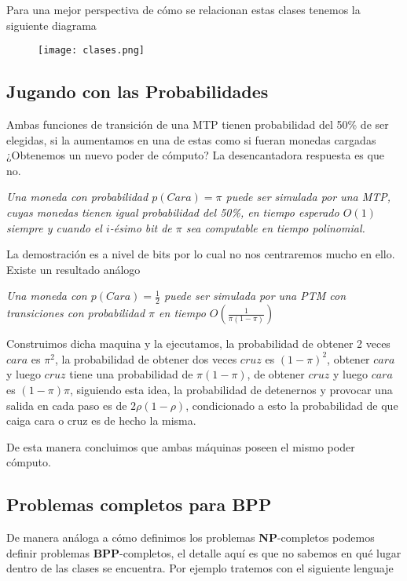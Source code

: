 \documentclass[12pt,letterpaper]{article}
\begin{document}
Para una mejor perspectiva de cómo se relacionan estas clases tenemos la siguiente diagrama

\begin{figure}[htb]
        \centering
        \texttt{[image: clases.png]}
\end{figure}

\subsection*{Jugando con las Probabilidades}

Ambas funciones de transición de una MTP tienen probabilidad del 50\% de ser elegidas, si la aumentamos en una de estas como si fueran monedas cargadas ¿Obtenemos un nuevo poder de cómputo? La desencantadora respuesta es que no.

\textit{Una moneda con probabilidad $p(Cara) = \pi$ puede ser simulada por una MTP, cuyas monedas tienen igual probabilidad del 50\%,  en tiempo esperado $O(1)$ siempre y cuando el $i$-ésimo bit de $\pi$ sea computable en tiempo polinomial.}

La demostración es a nivel de bits por lo cual no nos centraremos mucho en ello. Existe un resultado análogo 

\textit{Una moneda con $p(Cara) = \frac{1}{2}$ puede ser simulada por una PTM con transiciones con probabilidad $\pi$ en tiempo $O(\frac{1}{\pi(1-\pi)})$}

Construimos dicha maquina y la ejecutamos, la probabilidad de obtener 2 veces $cara$ es $\pi ^2$, la probabilidad de obtener dos veces $cruz$ es $(1-\pi)^2$, obtener $cara$ y luego $cruz$ tiene una probabilidad de $\pi (1-\pi)$, de obtener $cruz$ y luego $cara$ es $(1-\pi)\pi$, siguiendo esta idea, la probabilidad de detenernos y provocar una salida en cada paso es de $2\rho(1-\rho)$, condicionado a esto la probabilidad de que caiga cara o cruz es de hecho la misma.

De esta manera concluimos que ambas máquinas poseen el mismo poder cómputo.

\subsection*{Problemas completos para BPP}

De manera análoga a cómo definimos los problemas \textbf{NP}-completos podemos definir problemas \textbf{BPP}-completos, el detalle aquí es que no sabemos en qué lugar dentro de las clases se encuentra. Por ejemplo tratemos con el siguiente lenguaje
\end{document}
